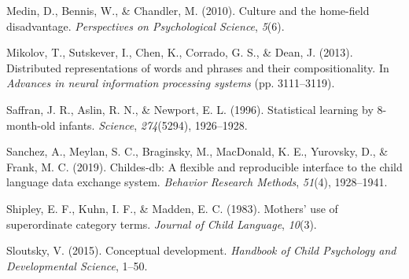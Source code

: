 \documentclass[english,,man,floatsintext]{apa6}
\begin{document}
\leavevmode\hypertarget{ref-medin2010}{}%
Medin, D., Bennis, W., \& Chandler, M. (2010). Culture and the home-field disadvantage. \emph{Perspectives on Psychological Science}, \emph{5}(6).

\leavevmode\hypertarget{ref-mikolov2013}{}%
Mikolov, T., Sutskever, I., Chen, K., Corrado, G. S., \& Dean, J. (2013). Distributed representations of words and phrases and their compositionality. In \emph{Advances in neural information processing systems} (pp. 3111--3119).

\leavevmode\hypertarget{ref-saffran1996}{}%
Saffran, J. R., Aslin, R. N., \& Newport, E. L. (1996). Statistical learning by 8-month-old infants. \emph{Science}, \emph{274}(5294), 1926--1928.

\leavevmode\hypertarget{ref-sanchez2019}{}%
Sanchez, A., Meylan, S. C., Braginsky, M., MacDonald, K. E., Yurovsky, D., \& Frank, M. C. (2019). Childes-db: A flexible and reproducible interface to the child language data exchange system. \emph{Behavior Research Methods}, \emph{51}(4), 1928--1941.

\leavevmode\hypertarget{ref-shipley1983}{}%
Shipley, E. F., Kuhn, I. F., \& Madden, E. C. (1983). Mothers' use of superordinate category terms. \emph{Journal of Child Language}, \emph{10}(3).

\leavevmode\hypertarget{ref-sloutsky2015}{}%
Sloutsky, V. (2015). Conceptual development. \emph{Handbook of Child Psychology and Developmental Science}, 1--50.
\end{document}
